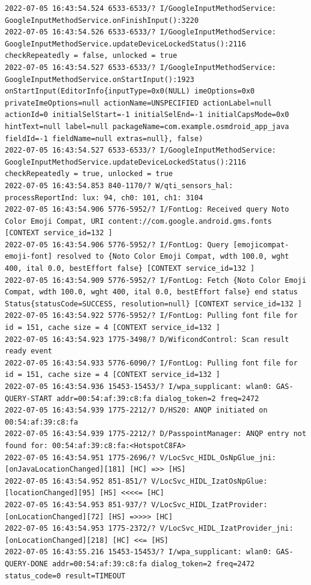 \documentclass[a4paper,12pt]{book}
\begin{document}
\begin{lstlisting}
2022-07-05 16:43:54.524 6533-6533/? I/GoogleInputMethodService: GoogleInputMethodService.onFinishInput():3220 
2022-07-05 16:43:54.526 6533-6533/? I/GoogleInputMethodService: GoogleInputMethodService.updateDeviceLockedStatus():2116 checkRepeatedly = false, unlocked = true
2022-07-05 16:43:54.527 6533-6533/? I/GoogleInputMethodService: GoogleInputMethodService.onStartInput():1923 onStartInput(EditorInfo{inputType=0x0(NULL) imeOptions=0x0 privateImeOptions=null actionName=UNSPECIFIED actionLabel=null actionId=0 initialSelStart=-1 initialSelEnd=-1 initialCapsMode=0x0 hintText=null label=null packageName=com.example.osmdroid_app_java fieldId=-1 fieldName=null extras=null}, false)
2022-07-05 16:43:54.527 6533-6533/? I/GoogleInputMethodService: GoogleInputMethodService.updateDeviceLockedStatus():2116 checkRepeatedly = true, unlocked = true
2022-07-05 16:43:54.853 840-1170/? W/qti_sensors_hal: processReportInd: lux: 94, ch0: 101, ch1: 3104
2022-07-05 16:43:54.906 5776-5952/? I/FontLog: Received query Noto Color Emoji Compat, URI content://com.google.android.gms.fonts [CONTEXT service_id=132 ]
2022-07-05 16:43:54.906 5776-5952/? I/FontLog: Query [emojicompat-emoji-font] resolved to {Noto Color Emoji Compat, wdth 100.0, wght 400, ital 0.0, bestEffort false} [CONTEXT service_id=132 ]
2022-07-05 16:43:54.909 5776-5952/? I/FontLog: Fetch {Noto Color Emoji Compat, wdth 100.0, wght 400, ital 0.0, bestEffort false} end status Status{statusCode=SUCCESS, resolution=null} [CONTEXT service_id=132 ]
2022-07-05 16:43:54.922 5776-5952/? I/FontLog: Pulling font file for id = 151, cache size = 4 [CONTEXT service_id=132 ]
2022-07-05 16:43:54.923 1775-3498/? D/WificondControl: Scan result ready event
2022-07-05 16:43:54.933 5776-6090/? I/FontLog: Pulling font file for id = 151, cache size = 4 [CONTEXT service_id=132 ]
2022-07-05 16:43:54.936 15453-15453/? I/wpa_supplicant: wlan0: GAS-QUERY-START addr=00:54:af:39:c8:fa dialog_token=2 freq=2472
2022-07-05 16:43:54.939 1775-2212/? D/HS20: ANQP initiated on 00:54:af:39:c8:fa
2022-07-05 16:43:54.939 1775-2212/? D/PasspointManager: ANQP entry not found for: 00:54:af:39:c8:fa:<HotspotC8FA>
2022-07-05 16:43:54.951 1775-2696/? V/LocSvc_HIDL_OsNpGlue_jni: [onJavaLocationChanged][181] [HC] =>> [HS]
2022-07-05 16:43:54.952 851-851/? V/LocSvc_HIDL_IzatOsNpGlue: [locationChanged][95] [HS] <<<<= [HC]
2022-07-05 16:43:54.953 851-937/? V/LocSvc_HIDL_IzatProvider: [onLocationChanged][72] [HS] =>>>> [HC]
2022-07-05 16:43:54.953 1775-2372/? V/LocSvc_HIDL_IzatProvider_jni: [onLocationChanged][218] [HC] <<= [HS]
2022-07-05 16:43:55.216 15453-15453/? I/wpa_supplicant: wlan0: GAS-QUERY-DONE addr=00:54:af:39:c8:fa dialog_token=2 freq=2472 status_code=0 result=TIMEOUT

\end{lstlisting}
\end{document}
